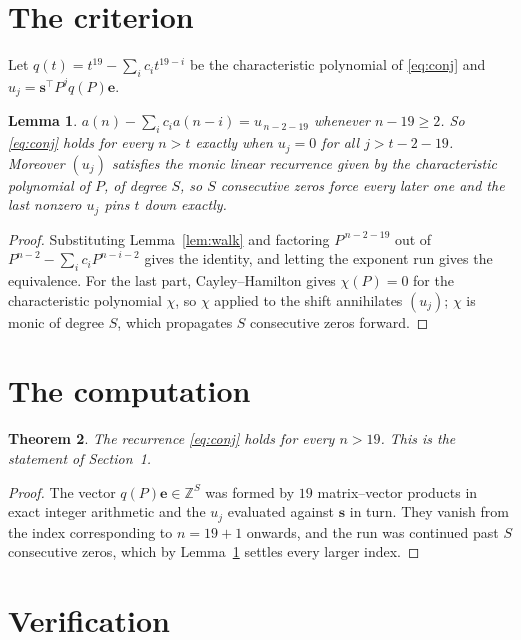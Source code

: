 \documentclass[11pt,a4paper]{article}
\theoremstyle{plain}
\newtheorem{theorem}{Theorem}
\newtheorem{lemma}[theorem]{Lemma}
\theoremstyle{definition}
\begin{document}
\section{The criterion}

Let $q(t)=t^{19}-\sum_i c_i t^{19-i}$ be the characteristic polynomial of
\eqref{eq:conj} and $u_j=\mathbf{s}^{\!\top}P^{j}q(P)\mathbf{e}$.

\begin{lemma}\label{lem:crit}
$a(n)-\sum_i c_i a(n-i)=u_{\,n-2-19}$ whenever $n-19\ge2$. So \eqref{eq:conj}
holds for every $n>t$ exactly when $u_j=0$ for all $j>t-2-19$. Moreover $(u_j)$
satisfies the monic linear recurrence given by the characteristic polynomial of $P$, of
degree $S$, so $S$ consecutive zeros force every later one and the last nonzero $u_j$ pins
$t$ down exactly.
\end{lemma}

\begin{proof}
Substituting Lemma~\ref{lem:walk} and factoring $P^{\,n-2-19}$ out of
$P^{n-2}-\sum_i c_i P^{n-i-2}$ gives the identity, and letting the exponent run gives the
equivalence. For the last part, Cayley--Hamilton gives $\chi(P)=0$ for the characteristic
polynomial $\chi$, so $\chi$ applied to the shift annihilates $(u_j)$; $\chi$ is monic of
degree $S$, which propagates $S$ consecutive zeros forward.
\end{proof}

\section{The computation}

\begin{theorem}
The recurrence \eqref{eq:conj} holds for every $n>19$. This is the statement of
Section~1.
\end{theorem}

\begin{proof}
The vector $q(P)\mathbf{e}\in\mathbb{Z}^{S}$ was formed by $19$ matrix--vector
products in exact integer arithmetic and the $u_j$ evaluated against $\mathbf{s}$ in turn.
They vanish from the index corresponding to $n=19+1$ onwards, and the run was continued
past $S$ consecutive zeros, which by Lemma~\ref{lem:crit} settles every larger index.
\end{proof}

\section{Verification}
\end{document}

